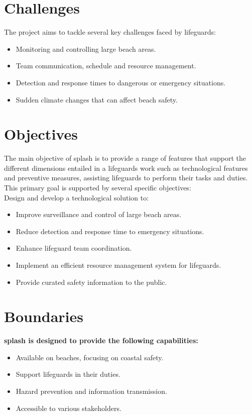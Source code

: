 \section{Challenges}
\label{section:challenges}
The project aims to tackle several key challenges faced by lifeguards:

    \begin{itemize}
        \item Monitoring and controlling large beach areas.
        \item Team communication, schedule and resource management.
        \item Detection and response times to dangerous or emergency situations.
        \item Sudden climate changes that can affect beach safety.
    \end{itemize}

\section{Objectives}
\label{section:objectives}
The main objective of \ac{splash} is to provide a range of features that support the different dimensions entailed in a lifeguards work
such as technological features and preventive measures, assisting lifeguards to perform their tasks and duties. This primary goal is supported by several specific objectives: \\ 

Design and develop a technological solution to:
\begin{itemize}
    \item Improve surveillance and control of large beach areas.
    \item Reduce detection and response time to emergency situations. 
    \item Enhance lifeguard team coordination.
    \item Implement an efficient resource management system for lifeguards.
    \item Provide curated safety information to the public.
\end{itemize}
      
\section{Boundaries}
\label{section:boundaries}

\textbf{\ac{splash} is designed to provide the following capabilities: }
\\
    \begin{itemize}
        \item Available on beaches, focusing on coastal safety.
        \item Support lifeguards in their duties.
        \item Hazard prevention and information transmission.
     \item Accessible to various stakeholders. 
\end{itemize}

